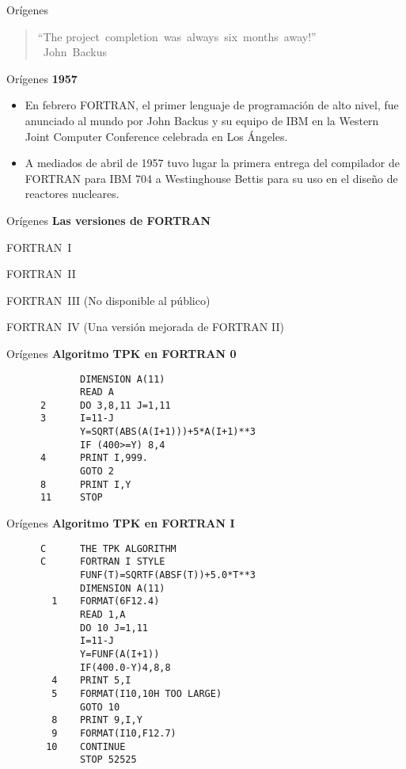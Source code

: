\begin{frame}[fragile]{Orígenes}
  \begin{quote}
    ``The project completion was always six months away!''\\
     John Backus
  \end{quote}
\end{frame}


\begin{frame}[fragile]{Orígenes}
  \textbf{1957}
  \begin{itemize}[<+(1)->]
    \item[] En febrero FORTRAN, el primer lenguaje de programación de alto nivel, fue anunciado al mundo por John Backus y su equipo de IBM en la Western Joint Computer Conference celebrada en Los Ángeles.
    \item[] A mediados de abril de 1957 tuvo lugar la primera entrega del compilador de FORTRAN para IBM 704 a Westinghouse Bettis para su uso en el diseño de reactores nucleares.
  \end{itemize}
\end{frame}


\begin{frame}[fragile]{Orígenes}
  \textbf{Las versiones de FORTRAN}
  \begin{description}[<+(1)->]
    \item[1957] FORTRAN I
    \item[1958] FORTRAN II
    \item[1958] FORTRAN III (No disponible al público)
    \item[1961] FORTRAN IV (Una versión mejorada de FORTRAN II)
      \end{description}
\end{frame}


\begin{frame}[fragile]{Orígenes}
    \textbf{Algoritmo TPK en FORTRAN 0}
    \begin{verbatim}
             DIMENSION A(11)
             READ A
      2      DO 3,8,11 J=1,11
      3      I=11-J
             Y=SQRT(ABS(A(I+1)))+5*A(I+1)**3
             IF (400>=Y) 8,4
      4      PRINT I,999.
             GOTO 2
      8      PRINT I,Y
      11     STOP
    \end{verbatim}
\end{frame}


\begin{frame}[fragile]{Orígenes}
    \textbf{Algoritmo TPK en FORTRAN I}
    \begin{verbatim}
      C      THE TPK ALGORITHM
      C      FORTRAN I STYLE
             FUNF(T)=SQRTF(ABSF(T))+5.0*T**3
             DIMENSION A(11)
        1    FORMAT(6F12.4)
             READ 1,A
             DO 10 J=1,11
             I=11-J
             Y=FUNF(A(I+1))
             IF(400.0-Y)4,8,8
        4    PRINT 5,I
        5    FORMAT(I10,10H TOO LARGE)
             GOTO 10
        8    PRINT 9,I,Y
        9    FORMAT(I10,F12.7)
       10    CONTINUE
             STOP 52525
    \end{verbatim}
\end{frame}


